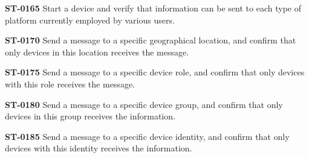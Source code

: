 \begin{description}
\item\textbf{ST-0165} Start a device and verify that information can be sent to each type of platform currently employed by various users. 
\item\textbf{ST-0170} Send a message to a specific geographical location, and confirm that only devices in this location receives the message. 
\item\textbf{ST-0175} Send a message to a specific device role, and confirm that only devices with this role receives the message. 
\item\textbf{ST-0180} Send a message to a specific device group, and confirm that only devices in this group receives the information.
\item\textbf{ST-0185} Send a message to a specific device identity, and confirm that only devices with this identity receives the information. 

\end{description}

